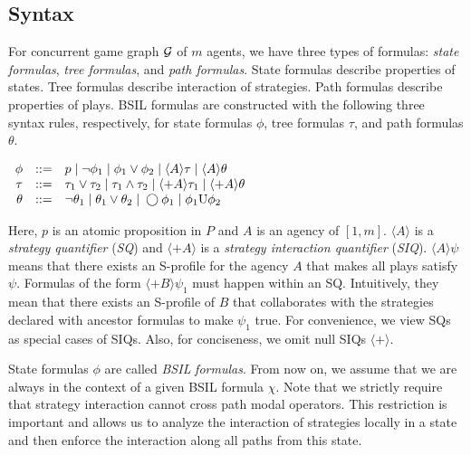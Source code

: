 \subsection{Syntax}
For concurrent game graph ${\cal G}$ of $m$ agents, we have three types of formulas: {\em state formulas}, {\em tree formulas}, and {\em path formulas}.  
State formulas describe properties of states.  
Tree formulas describe interaction of strategies.  
Path formulas describe properties of plays.  
BSIL formulas are constructed with the following three syntax rules, 
respectively, for state formulas $\phi$, 
tree formulas $\tau$, and 
path formulas $\theta$.  
\begin{center}
$\begin{array}{rcl}
\phi    & ::= & p\;|\; \neg \phi_1 \;|\; \phi_1\vee \phi_2 
    \;|\; \langle  A\rangle \tau
    \;|\; \langle  A\rangle \theta
    \\
\tau  & ::= & \tau_1\vee \tau_2 \;|\; \tau_1\wedge \tau_2
    \;|\; \langle+ A\rangle \tau_1
    \;|\; \langle+ A\rangle\theta 
    \\
\theta  & ::= & \neg\theta_1 \;|\; \theta_1\vee \theta_2 
    \;|\; \bigcirc \phi_1
    \;|\; \phi_1\textrm{U} \phi_2
\end{array}$
\end{center}
Here, $p$ is an atomic proposition in $P$ and
$A$ is an agency of $[1,m]$.
$\langle A\rangle$ is a {\em strategy quantifier} ({\em SQ}) and 
$\langle +A\rangle$ is a {\em strategy interaction quantifier} ({\em SIQ}).  
$\langle A\rangle\psi$ means that
there exists an S-profile for the agency $A$
that makes all plays satisfy $\psi$.
Formulas of the form $\langle+ B\rangle\psi_1$ must happen within an SQ.
Intuitively, they mean that there exists an S-profile of $B$
that collaborates with the strategies declared 
with ancestor formulas to make $\psi_1$ true. 
For convenience, we view SQs as special cases of SIQs. 
Also, for conciseness, we omit null SIQs $\langle+\rangle$.

State formulas $\phi$ are called {\em BSIL} {\em formulas}. 
From now on, we assume that we are always in the context of 
a given BSIL formula $\chi$.  
Note that we strictly require that strategy interaction cannot 
cross path modal operators.  
This restriction is important and allows us to analyze the interaction 
of strategies locally in a state and 
then enforce the interaction along all paths from this state.  

